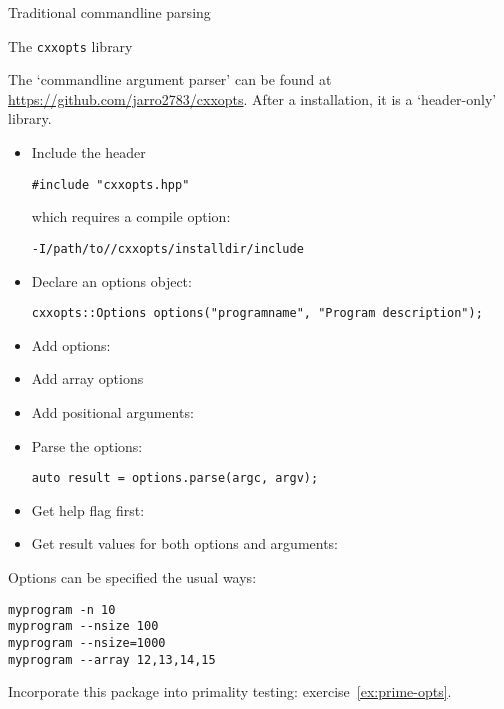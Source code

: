  {Traditional commandline parsing}


 {The \texttt{cxxopts} library}

The  `commandline argument parser'
can be found at \url{https://github.com/jarro2783/cxxopts}.
After a  installation, it is a `header-only' library.

\begin{itemize}
\item Include the header
\begin{lstlisting}
#include "cxxopts.hpp"
\end{lstlisting}
which requires a compile option:
\begin{verbatim}
-I/path/to//cxxopts/installdir/include
\end{verbatim}
\item Declare an options object:
\begin{lstlisting}
cxxopts::Options options("programname", "Program description");
\end{lstlisting}

\item Add options:

\item Add array options

\item Add positional arguments:

\item Parse the options:
\begin{lstlisting}
auto result = options.parse(argc, argv);
\end{lstlisting}

\item Get help flag first:

\item Get result values
  for both options and arguments:
\end{itemize}

Options can be specified the usual ways:
\begin{verbatim}
myprogram -n 10
myprogram --nsize 100
myprogram --nsize=1000
myprogram --array 12,13,14,15
\end{verbatim}

\begin{exercise}
  Incorporate this package into primality testing:
  exercise~\ref{ex:prime-opts}.
\end{exercise}


